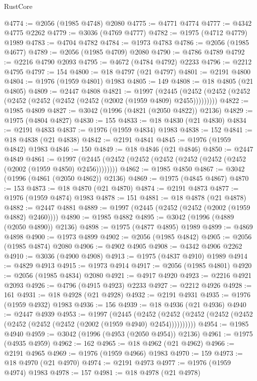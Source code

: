 \begin{lexlean}{RustCore}
\begin{coremodule}
@4774 := @2056 (@1985 @4748) @2080
@4775 := @4771 @4774
@4777 := @4342 @4775 @2262
@4779 := @3036 (@4769 @4777)
@4782 := @1975 (@4712 @4779) @1989
@4783 := @4704 @4782
@4784 := @1973 @4783
@4786 := @2056 (@1985 @4677)
@4789 := @2056 (@1985 @4709) @2080
@4790 := @4786 @4789
@4792 := @2216 @4790 @2093
@4795 := @4672 (@4784 @4792) @2233
@4796 := @2212 @4795
@4797 := 154
@4800 := @18 @4797 (@21 @4797)
@4801 := @2191 @4800
@4804 := @1976 (@1959 @4801) @1983
@4805 := 149
@4808 := @18 @4805 (@21 @4805)
@4809 := @2447 @4808
@4821 := @1997
    (@2445 (@2452 (@2452 (@2452 (@2452 (@2452 (@2452 (@2452 (@2002 (@1959 @4809) @2455)))))))))
@4822 := @1985 @4809
@4827 := @3042 (@1996 (@4821 (@2050 @4822)) @2136)
@4829 := @1975 (@4804 @4827)
@4830 := 155
@4833 := @18 @4830 (@21 @4830)
@4834 := @2191 @4833
@4837 := @1976 (@1959 @4834) @1983
@4838 := 152
@4841 := @18 @4838 (@21 @4838)
@4842 := @2191 @4841
@4845 := @1976 (@1959 @4842) @1983
@4846 := 150
@4849 := @18 @4846 (@21 @4846)
@4850 := @2447 @4849
@4861 := @1997 (@2445 (@2452 (@2452 (@2452 (@2452 (@2452 (@2452 (@2002 (@1959 @4850) @2456))))))))
@4862 := @1985 @4850
@4867 := @3042 (@1996 (@4861 (@2050 @4862)) @2136)
@4869 := @1975 (@4845 @4867)
@4870 := 153
@4873 := @18 @4870 (@21 @4870)
@4874 := @2191 @4873
@4877 := @1976 (@1959 @4874) @1983
@4878 := 151
@4881 := @18 @4878 (@21 @4878)
@4882 := @2447 @4881
@4889 := @1997 (@2445 (@2452 (@2452 (@2002 (@1959 @4882) @2460))))
@4890 := @1985 @4882
@4895 := @3042 (@1996 (@4889 (@2050 @4890)) @2136)
@4898 := @1975 (@4877 @4895) @1989
@4899 := @4869 @4898
@4900 := @1973 @4899
@4902 := @2056 (@1985 @4842)
@4905 := @2056 (@1985 @4874) @2080
@4906 := @4902 @4905
@4908 := @4342 @4906 @2262
@4910 := @3036 (@4900 @4908)
@4913 := @1975 (@4837 @4910) @1989
@4914 := @4829 @4913
@4915 := @1973 @4914
@4917 := @2056 (@1985 @4801)
@4920 := @2056 (@1985 @4834) @2080
@4921 := @4917 @4920
@4923 := @2216 @4921 @2093
@4926 := @4796 (@4915 @4923) @2233
@4927 := @2212 @4926
@4928 := 161
@4931 := @18 @4928 (@21 @4928)
@4932 := @2191 @4931
@4935 := @1976 (@1959 @4932) @1983
@4936 := 156
@4939 := @18 @4936 (@21 @4936)
@4940 := @2447 @4939
@4953 := @1997
    (@2445
      (@2452 (@2452 (@2452 (@2452 (@2452 (@2452 (@2452 (@2452 (@2002 (@1959 @4940) @2454))))))))))
@4954 := @1985 @4940
@4959 := @3042 (@1996 (@4953 (@2050 @4954)) @2136)
@4961 := @1975 (@4935 @4959)
@4962 := 162
@4965 := @18 @4962 (@21 @4962)
@4966 := @2191 @4965
@4969 := @1976 (@1959 @4966) @1983
@4970 := 159
@4973 := @18 @4970 (@21 @4970)
@4974 := @2191 @4973
@4977 := @1976 (@1959 @4974) @1983
@4978 := 157
@4981 := @18 @4978 (@21 @4978)

\end{coremodule}
\end{lexlean}
